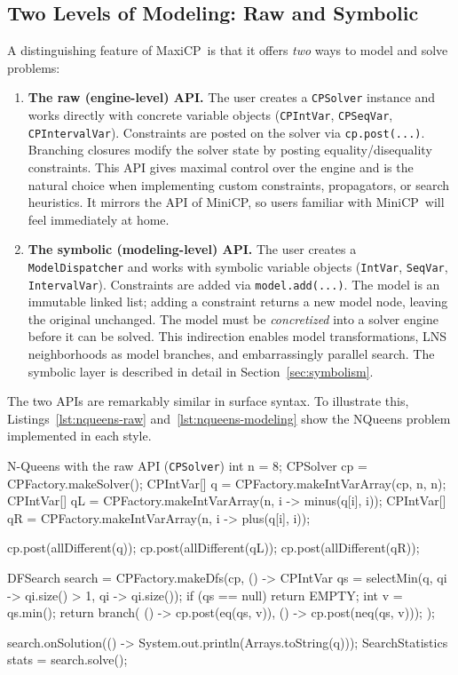 \documentclass[11pt, a4paper]{scrartcl}
\newcommand{\maxicp}{\textsf{MaxiCP}}
\newcommand{\minicp}{\textsf{MiniCP}}
\begin{document}
\subsection{Two Levels of Modeling: Raw and Symbolic}
\label{sec:two-layer-overview}

A distinguishing feature of \maxicp\ is that it offers \emph{two} ways to model and solve problems:

\begin{enumerate}
    \item \textbf{The raw (engine-level) API.}
    The user creates a \texttt{CPSolver} instance and works directly with concrete variable objects (\texttt{CPIntVar}, \texttt{CPSeqVar}, \texttt{CPIntervalVar}).
    Constraints are posted on the solver via \texttt{cp.post(...)}.
    Branching closures modify the solver state by posting equality/dis\-equality constraints.
    This API gives maximal control over the engine and is the natural choice when implementing custom constraints, propagators, or search heuristics.
    It mirrors the API of \minicp, so users familiar with \minicp\ will feel immediately at home.

    \item \textbf{The symbolic (modeling-level) API.}
    The user creates a \texttt{ModelDispatcher} and works with symbolic variable objects (\texttt{IntVar}, \texttt{SeqVar}, \texttt{IntervalVar}).
    Constraints are added via \texttt{model.add(...)}.
    The model is an immutable linked list; adding a constraint returns a new model node, leaving the original unchanged.
    The model must be \emph{concretized} into a solver engine before it can be solved.
    This indirection enables model transformations, LNS neighborhoods as model branches, and embarrassingly parallel search.
    The symbolic layer is described in detail in Section~\ref{sec:symbolism}.
\end{enumerate}

The two APIs are remarkably similar in surface syntax.
To illustrate this, Listings~\ref{lst:nqueens-raw} and~\ref{lst:nqueens-modeling} show the NQueens problem implemented in each style.

\begin{codebox}[label={lst:nqueens-raw}]{N-Queens with the raw API (\texttt{CPSolver})}
int n = 8;
CPSolver cp = CPFactory.makeSolver();
CPIntVar[] q  = CPFactory.makeIntVarArray(cp, n, n);
CPIntVar[] qL = CPFactory.makeIntVarArray(n, i -> minus(q[i], i));
CPIntVar[] qR = CPFactory.makeIntVarArray(n, i -> plus(q[i], i));

cp.post(allDifferent(q));
cp.post(allDifferent(qL));
cp.post(allDifferent(qR));

DFSearch search = CPFactory.makeDfs(cp, () -> {
    CPIntVar qs = selectMin(q,
            qi -> qi.size() > 1,
            qi -> qi.size());
    if (qs == null) return EMPTY;
    int v = qs.min();
    return branch(
        () -> cp.post(eq(qs, v)),
        () -> cp.post(neq(qs, v)));
});

search.onSolution(() ->
    System.out.println(Arrays.toString(q)));
SearchStatistics stats = search.solve();
\end{codebox}
\end{document}

